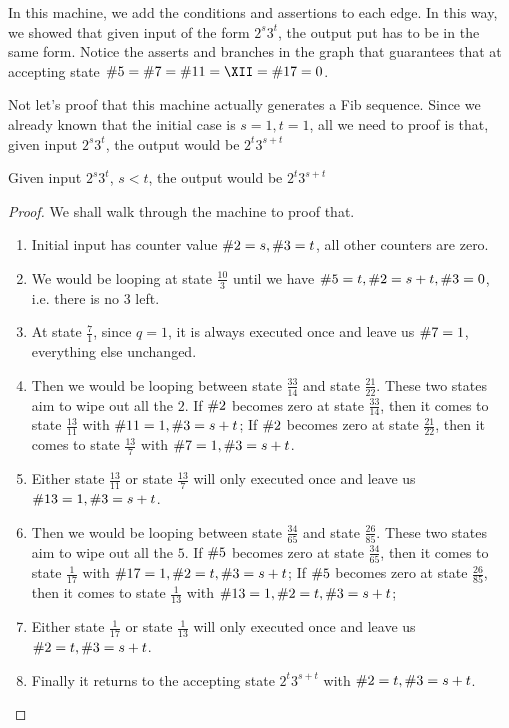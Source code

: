 In this machine, we add the conditions and assertions to each edge.
In this way, we showed that given input of the form $2^s3^t$, the output put has to be in the same form.
Notice the asserts and branches in the graph that guarantees that at accepting state $\V = \VII = \XI = \XII = \XVII = 0$.

Not let's proof that this machine actually generates a Fib sequence.
Since we already known that the initial case is $s = 1, t = 1$, all we need to proof is that, given input $2^s3^t$, the output would be $2^t3^{s+t}$

\begin{theorem}
    Given input $2^s3^t$, $s < t$, the output would be $2^t3^{s+t}$
\end{theorem}

\begin{proof}

    We shall walk through the machine to proof that.
    \begin{enumerate}
        \item Initial input has counter value $\II = s, \III = t$, all other counters are zero.
        \item We would be looping at state $\frac{10}{3}$ until we have $\V = t, \II = s + t, \III = 0$, i.e. there is no $3$ left. 
        \item At state $\frac{7}{1}$, since $q = 1$, it is always executed once and leave us $\VII = 1$, everything else unchanged.
        \item Then we would be looping between state $\frac{33}{14}$ and state $\frac{21}{22}$. These two states aim to wipe out all the $2$. If $\II$ becomes zero at state $\frac{33}{14}$, then it comes to state $\frac{13}{11}$ with $\XI = 1, \III = s + t$; If $\II$ becomes zero at state $\frac{21}{22}$, then it comes to state $\frac{13}{7}$ with $\VII = 1, \III = s + t$.
        \item Either state $\frac{13}{11}$ or state $\frac{13}{7}$ will only executed once and leave us $\XIII = 1, \III = s + t$. 
        \item Then we would be looping between state $\frac{34}{65}$ and state $\frac{26}{85}$. These two states aim to wipe out all the $5$. If $\V$ becomes zero at state $\frac{34}{65}$, then it comes to state $\frac{1}{17}$ with $\XVII = 1, \II = t, \III = s + t$; If $\V$ becomes zero at state $\frac{26}{85}$, then it comes to state $\frac{1}{13}$ with $\XIII = 1, \II = t, \III = s + t$;
        \item Either state $\frac{1}{17}$ or state $\frac{1}{13}$ will only executed once and leave us $\II = t, \III = s + t$. 
        \item Finally it returns to the accepting state $2^t3^{s+t}$ with $\II = t, \III = s + t$. 
    \end{enumerate}
\end{proof}
